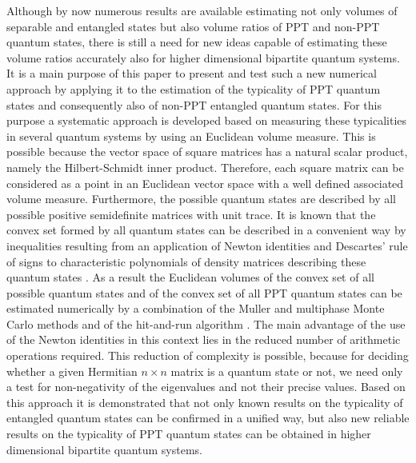 \documentclass[12pt]{iopart}
\begin{document}
Although by now numerous results are available estimating not only volumes of separable and entangled states but also volume ratios of PPT and non-PPT quantum states, there is still a need for new ideas capable of estimating these volume ratios accurately also for higher dimensional bipartite quantum systems. It is a main purpose of this paper to present and test such a new numerical approach by applying it to the estimation of the typicality of PPT quantum states and consequently also of non-PPT entangled quantum states. For this purpose a systematic 
approach is developed based on measuring these typicalities in several quantum systems by using an Euclidean volume measure. This is possible because the vector space of 
square matrices has a natural scalar product, namely the Hilbert-Schmidt inner product. Therefore, each square matrix can be considered as a point in an Euclidean vector space with a well defined 
associated volume measure. Furthermore, the possible quantum states are described by all possible positive semidefinite matrices with unit trace. It is known that the convex set formed by all 
quantum states can be described in a convenient way by inequalities resulting from an application of Newton identities \cite{Horn} and Descartes' rule of signs \cite{D1,D2} to characteristic 
polynomials of density matrices describing these quantum states \cite{Siennicki,Kimura,Byrd,Kryszewski,Gamel}. As a result the Euclidean volumes of the convex set of all possible quantum states 
and of the convex set of all PPT quantum states can be estimated numerically by a combination of the Muller \cite{Muller59,BoxM,Harman} and multiphase \cite{Kannan, Sim03} Monte Carlo methods
and of the hit-and-run algorithm \cite{Smith,LovaszV,LovaszV2}. 
The main advantage of the use of the Newton identities in this context lies in the reduced number of arithmetic operations required. This reduction of complexity is possible, because for deciding 
whether a given Hermitian $n\times n$ matrix is a quantum state or not, we need only a test for non-negativity of the eigenvalues and not their precise values.
Based on this approach it is demonstrated that not only known results on the typicality of entangled quantum states can be 
confirmed in a unified way, but also new reliable results on the typicality of PPT quantum states can be obtained in higher dimensional bipartite quantum systems.
\end{document}
